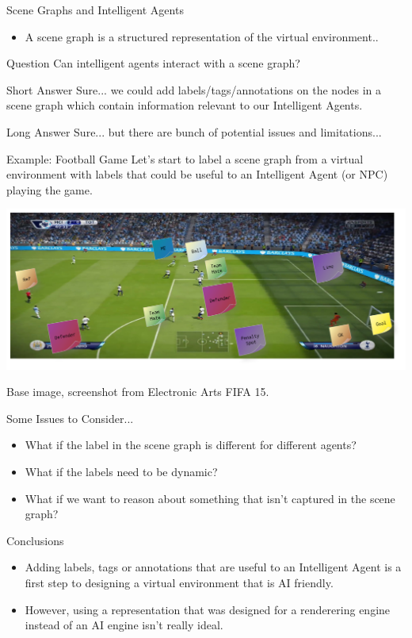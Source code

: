 \documentclass[xcolor=dvipsnames,t]{beamer}
\begin{document}
\begin{frame}{Scene Graphs and Intelligent Agents} 
\begin{itemize}
    \item A scene graph is a structured representation of the virtual environment..
\end{itemize} 
\begin{block}{Question}
Can intelligent agents interact with a scene graph?
\end{block} 
\pause
\begin{block}{Short Answer}
Sure... we could add labels/tags/annotations on the nodes in a scene graph
which contain information relevant to our Intelligent Agents. 
\end{block} 
\pause
\begin{block}{Long Answer} 
Sure... but there are bunch of potential issues and limitations...
\end{block} 

\end{frame} 

\begin{frame}{Example: Football Game} 
Let's start to label a scene graph from a virtual environment with labels that
could be useful to an Intelligent Agent (or NPC) playing the game.
\begin{center}
\includegraphics[width=\textwidth]{fifa-labels} 
\end{center}
Base image, screenshot from Electronic Arts FIFA 15.
\end{frame} 

\begin{frame}{Some Issues to Consider...} 
\begin{itemize} 
\item What if the label in the scene graph is different for different agents?
\item What if the labels need to be dynamic?  
\item What if we want to reason about something that isn't captured in the scene graph?
\end{itemize} 
\pause
\begin{block}{Conclusions}  
\begin{itemize} 
    \item Adding labels, tags or annotations that are useful to an Intelligent
    Agent is a first step to designing a virtual environment that is AI
    friendly.
    \item However, using a representation that was designed for a renderering
    engine instead of an AI engine isn't really ideal.
\end{itemize} 
\end{block} 
\end{frame} 
\end{document}

